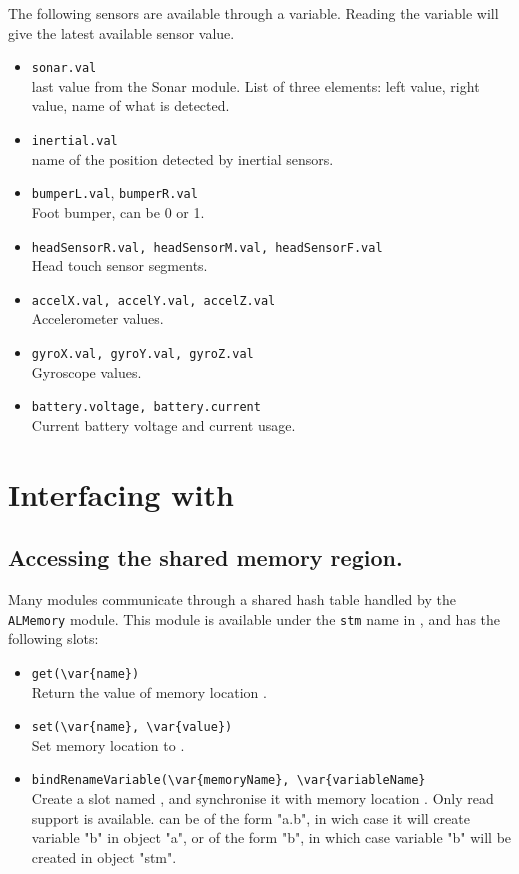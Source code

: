 The following sensors are available through a \us variable.
Reading the variable will give the latest available sensor value.

\begin{itemize}
\item \lstinline|sonar.val| \\
    last value from the Sonar module. List of three elements: left value, right
    value, name of what is detected.
\item \lstinline|inertial.val| \\
    name of the position detected by inertial sensors.
\item \lstinline|bumperL.val|, \lstinline|bumperR.val| \\
    Foot bumper, can be 0 or 1.
\item \lstinline|headSensorR.val, headSensorM.val, headSensorF.val| \\
    Head touch sensor segments.
\item \lstinline|accelX.val, accelY.val, accelZ.val| \\
    Accelerometer values.
\item \lstinline|gyroX.val, gyroY.val, gyroZ.val| \\
    Gyroscope values.
\item \lstinline|battery.voltage, battery.current| \\
    Current battery voltage and current usage.
\end{itemize}

\section{Interfacing with \naoqi}

\subsection{Accessing the \naoqi shared memory region.}

Many \naoqi modules communicate through a shared hash table handled by the
\lstinline|ALMemory| module. This module is available under the \lstinline|stm|
name in \urbi, and has the following slots:

\begin{itemize}
\item \lstinline|get(\var{name})| \\
  Return the value of memory location .
\item \lstinline|set(\var{name}, \var{value})| \\
  Set memory location  to .
\item \lstinline|bindRenameVariable(\var{memoryName}, \var{variableName}| \\
  Create a \us slot named , and synchronise it with memory
  location . Only read support is available.
   can be of the form "a.b", in wich case it will create
  variable "b" in object "a", or of the form "b", in which case variable "b"
  will be created in object "stm".
\end{itemize}

